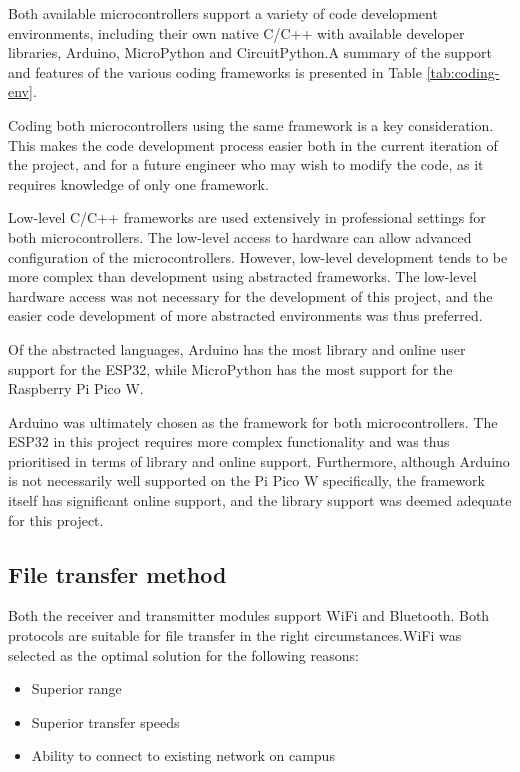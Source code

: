 Both available microcontrollers support a variety of code development environments, including their own native C/C++ with available developer libraries, Arduino, MicroPython and CircuitPython.A summary of the support and features of the various coding frameworks is presented in Table \ref{tab:coding-env}.

Coding both microcontrollers using the same framework is a key consideration. This makes the code development process easier both in the current iteration of the project, and for a future engineer who may wish to modify the code, as it requires knowledge of only one framework. 

Low-level C/C++ frameworks are used extensively in professional settings for both microcontrollers. The low-level access to hardware can allow advanced configuration of the microcontrollers. However, low-level development tends to be more complex than development using abstracted frameworks. The low-level hardware access was not necessary for the development of this project, and the easier code development of more abstracted environments was thus preferred.

Of the abstracted languages, Arduino has the most library and online user support for the ESP32, while MicroPython has the most support for the Raspberry Pi Pico W.

Arduino was ultimately chosen as the framework for both microcontrollers. The ESP32 in this project requires more complex functionality and was thus prioritised in terms of library and online support. Furthermore, although Arduino is not necessarily well supported on the Pi Pico W specifically, the framework itself has significant online support, and the library support was deemed adequate for this project.

\subsection{File transfer method}

Both the receiver and transmitter modules support WiFi and Bluetooth. Both protocols are suitable for file transfer in the right circumstances.WiFi was selected as the optimal solution for the following reasons:
\begin{itemize}
    \item Superior range
    \item Superior transfer speeds
    \item Ability to connect to existing network on campus
\end{itemize}

